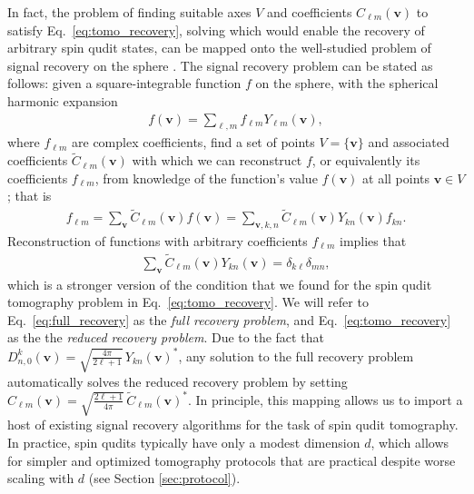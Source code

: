 \documentclass[notitlepage,twocolumn]{revtex4-2}
\newcommand{\p}[1]{\left(#1\right)} %
\renewcommand{\v}{\bm} %
\renewcommand{\set}[1]{\{#1\}} %
\begin{document}
In fact, the problem of finding suitable axes $V$ and coefficients $C_{\ell m}\p{\v v}$ to satisfy Eq.~\eqref{eq:tomo_recovery}, solving which would enable the recovery of arbitrary spin qudit states, can be mapped onto the well-studied problem of signal recovery on the sphere \cite{mcewen2011novel, rauhut2011sparse, alem2012sparse, khalid2014optimaldimensionality}.
The signal recovery problem can be stated as follows: given a square-integrable function $f$ on the sphere, with the spherical harmonic expansion
\begin{align}
  f\p{\v v} = \sum_{\ell,m} f_{\ell m} Y_{\ell m}\p{\v v},
\end{align}
where $f_{\ell m}$ are complex coefficients, find a set of points $V=\set{\v v}$ and associated coefficients $\tilde C_{\ell m}\p{\v v}$ with which we can reconstruct $f$, or equivalently its coefficients $f_{\ell m}$, from knowledge of the function's value $f\p{\v v}$ at all points $\v v\in V$; that is
\begin{align}
  f_{\ell m} = \sum_{\v v} \tilde C_{\ell m}\p{\v v} f\p{\v v}
  = \sum_{\v v,k,n} \tilde C_{\ell m}\p{\v v} Y_{kn}\p{\v v} f_{kn}.
\end{align}
Reconstruction of functions with arbitrary coefficients $f_{\ell m}$ implies that
\begin{align}
  \sum_{\v v} \tilde C_{\ell m}\p{\v v} Y_{kn}\p{\v v}
  = \delta_{k\ell} \delta_{mn},
  \label{eq:full_recovery}
\end{align}
which is a stronger version of the condition that we found for the spin qudit tomography problem in Eq.~\eqref{eq:tomo_recovery}.
We will refer to Eq.~\eqref{eq:full_recovery} as the {\it full recovery problem}, and Eq.~\eqref{eq:tomo_recovery} as the the {\it reduced recovery problem}.
Due to the fact that $D^k_{n,0}\p{\v v} = \sqrt{\frac{4\pi}{2\ell+1}}\, Y_{kn}\p{\v v}^*$, any solution to the full recovery problem automatically solves the reduced recovery problem by setting $C_{\ell m}\p{\v v} = \sqrt{\frac{2\ell+1}{4\pi}}\, \tilde C_{\ell m}\p{\v v}^*$.
In principle, this mapping allows us to import a host of existing signal recovery algorithms \cite{mcewen2011novel, rauhut2011sparse, alem2012sparse, khalid2014optimaldimensionality} for the task of spin qudit tomography.
In practice, spin qudits typically have only a modest dimension $d$, which allows for simpler and optimized tomography protocols that are practical despite worse scaling with $d$ (see Section \ref{sec:protocol}).
\end{document}
